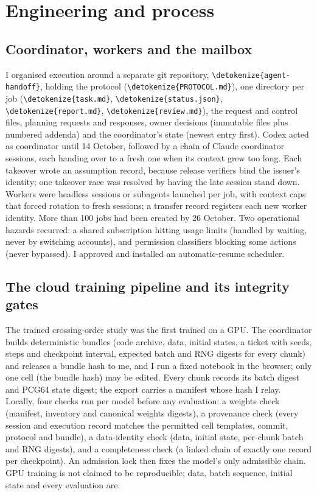 \documentclass[11pt,a4paper]{article}
\DeclareRobustCommand{\_}{\ifmmode\origunderscore\else\textunderscore\allowbreak\fi}
\DeclareRobustCommand{\fpath}[1]{\begingroup\small\expandafter\nolinkurl\expandafter{\detokenize{#1}}\endgroup}
\begin{document}
\section{Engineering and process}\label{sec:engineering}

\subsection{Coordinator, workers and the mailbox}
I organised execution around a separate git repository, \fpath{agent-handoff}, holding the
protocol (\fpath{PROTOCOL.md}), one directory per job (\fpath{task.md}, \fpath{status.json},
\fpath{report.md}, \fpath{review.md}), the request and control files, planning requests and responses,
owner decisions (immutable files plus numbered addenda) and the coordinator's state
(newest entry first). Codex acted as coordinator until 14 October, followed by a chain of
Claude coordinator sessions, each handing over to a fresh one when its context grew too long.
Each takeover wrote an assumption record, because release verifiers bind the issuer's identity;
one takeover race was resolved by having the late session stand down. Workers were headless
sessions or subagents launched per job, with context caps that forced rotation to fresh
sessions; a transfer record registers each new worker identity. More than 100 jobs had been
created by 26 October. Two
operational hazards recurred: a shared subscription hitting usage limits (handled by waiting,
never by switching accounts), and permission classifiers blocking some actions (never
bypassed). I approved and installed an automatic-resume scheduler.

\subsection{The cloud training pipeline and its integrity gates}
The trained crossing-order study was the first trained on a GPU. The coordinator builds deterministic bundles (code
archive, data, initial states, a ticket with seeds, steps and checkpoint interval, expected batch
and RNG digests for every chunk) and releases a bundle hash to me, and I run a fixed
notebook in the browser; only one cell (the bundle hash) may be edited. Every chunk records its
batch digest and PCG64 state digest; the export carries a manifest whose hash I relay.
Locally, four checks run per model before any evaluation: a weights check (manifest, inventory
and canonical weights digests), a provenance check (every session and execution record matches
the permitted cell templates, commit, protocol and bundle), a data-identity check (data, initial
state, per-chunk batch and RNG digests), and a completeness check (a linked chain of exactly one
record per checkpoint). An
admission lock then fixes the model's only admissible chain. GPU training is not claimed to be
reproducible; data, batch sequence, initial state and every evaluation are.
\end{document}

